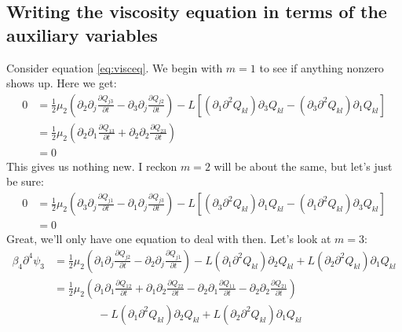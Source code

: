 \documentclass[reqno]{article}
\begin{document}
	\subsection{Writing the viscosity equation in terms of the auxiliary variables}
	Consider equation \eqref{eq:visceq}. We begin with $m = 1$ to see if anything nonzero shows up. Here we get:
	\begin{equation}
	\begin{split}
	0 &= \frac{1}{2}\mu_2\left( \partial_2 \partial_j \frac{\partial Q_{j3}}{\partial t} - \partial_3 \partial_j \frac{\partial Q_{j2}}{\partial t} \right) - L\left[ \left( \partial_1\partial^2 Q_{kl} \right) \partial_3 Q_{kl} - \left( \partial_3 \partial^2 Q_{kl} \right) \partial_1 Q_{kl} \right] \\
	&= \frac{1}{2}\mu_2 \left( \partial_2\partial_1 \frac{\partial Q_{13}}{\partial t} + \partial_2\partial_2 \frac{\partial Q_{23}}{\partial t} \right) \\
	&= 0
	\end{split}
	\end{equation}
	This gives us nothing new. I reckon $m = 2$ will be about the same, but let's just be sure:
	\begin{equation}
	\begin{split}
	0 &= \frac{1}{2}\mu_2 \left( \partial_3 \partial_j \frac{\partial Q_{j1}}{\partial t} - \partial_1\partial_j \frac{\partial Q_{j3}}{\partial t} \right) - L\left[ \left( \partial_3\partial^2 Q_{kl} \right)\partial_1 Q_{kl} - \left( \partial_1\partial^2 Q_{kl} \right)\partial_3 Q_{kl} \right] \\
	&= 0
	\end{split}
	\end{equation}
	Great, we'll only have one equation to deal with then. Let's look at $m = 3$:
	\begin{equation}\label{eq:biharmexplcit}
	\begin{split}
		\beta_4\partial^4 \psi_3 &= \frac{1}{2}\mu_2 \left( \partial_1 \partial_j \frac{\partial Q_{j2}}{\partial t} - \partial_2\partial_j\frac{\partial Q_{j1}}{\partial t} \right) - L\left( \partial_1\partial^2 Q_{kl} \right)\partial_2 Q_{kl} + L\left( \partial_2 \partial^2 Q_{kl} \right) \partial_1 Q_{kl} \\
		&= \frac{1}{2}\mu_2 \left( \partial_1\partial_1 \frac{\partial Q_{12}}{\partial t} + \partial_1\partial_2 \frac{\partial Q_{22}}{\partial t} - \partial_2\partial_1 \frac{\partial Q_{11}}{\partial t} - \partial_2 \partial_2 \frac{\partial Q_{21}}{\partial t} \right)\\
		&\qquad\qquad -  L\left( \partial_1\partial^2 Q_{kl} \right)\partial_2 Q_{kl} + L\left( \partial_2 \partial^2 Q_{kl} \right) \partial_1 Q_{kl} \\
	\end{split}
	\end{equation}
\end{document}
